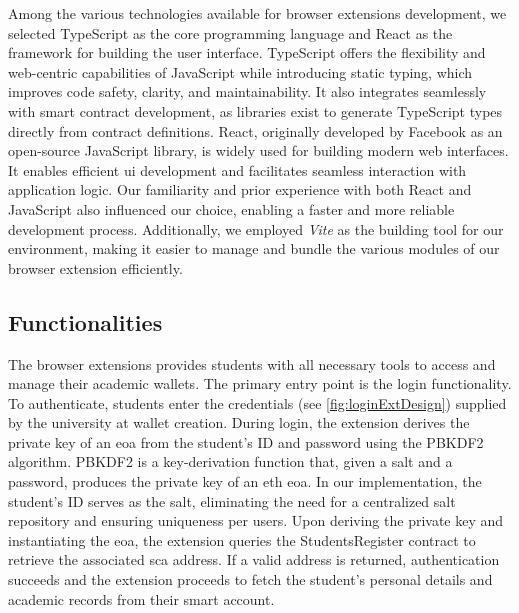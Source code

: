 Among the various technologies available for browser extensions development, we selected TypeScript as the core programming language and React as the framework for building the user interface. TypeScript offers the flexibility and web-centric capabilities of JavaScript while introducing static typing, which improves code safety, clarity, and maintainability. It also integrates seamlessly with smart contract development, as libraries exist to generate TypeScript types directly from contract definitions.
React, originally developed by Facebook as an open-source JavaScript library, is widely used for building modern web interfaces. It enables efficient \acrshort{ui} development and facilitates seamless interaction with application logic.
Our familiarity and prior experience with both React and JavaScript also influenced our choice, enabling a faster and more reliable development process. Additionally, we employed \textit{Vite} as the building tool for our environment, making it easier to manage and bundle the various modules of our browser extension efficiently.

\subsection{Functionalities}
\label{ssec:extFunctionalities}
The browser extensions provides students with all necessary tools to access and manage their academic wallets. The primary entry point is the login functionality. To authenticate, students enter the credentials (see \cref{fig:loginExtDesign}) supplied by the university at wallet creation. During login, the extension derives the private key of an \acrshort{eoa} from the student's ID and password using the PBKDF2 algorithm. PBKDF2 is a key-derivation function that, given a \gls{salt} and a password, produces the private key of an \acrlong{eth} \acrlong{eoa}. In our implementation, the student's ID serves as the \gls{salt}, eliminating the need for a centralized \gls{salt} repository and ensuring uniqueness per users. Upon deriving the private key and instantiating the \acrlong{eoa}, the extension queries the StudentsRegister contract to retrieve the associated \acrlong{sca} address. If a valid address is returned, authentication succeeds and the extension proceeds to fetch the student's personal details and academic records from their smart account.


